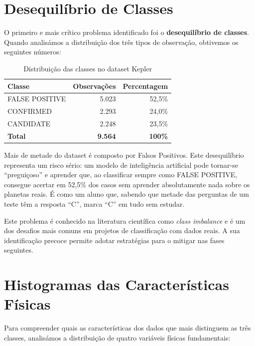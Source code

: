 \documentclass[12pt, a4paper]{report}
\begin{document}
\section{Desequilíbrio de Classes}

O primeiro e mais crítico problema identificado foi o \textbf{desequilíbrio de classes}. Quando analisámos a distribuição dos três tipos de observação, obtivemos os seguintes números:

\begin{table}[h]
\centering
\caption{Distribuição das classes no dataset Kepler}
\begin{tabular}{lrr}
\toprule
\textbf{Classe} & \textbf{Observações} & \textbf{Percentagem} \\
\midrule
FALSE POSITIVE & 5.023 & 52,5\% \\
CONFIRMED & 2.293 & 24,0\% \\
CANDIDATE & 2.248 & 23,5\% \\
\midrule
\textbf{Total} & \textbf{9.564} & \textbf{100\%} \\
\bottomrule
\end{tabular}
\end{table}

\begin{caixaatencao}
Mais de metade do dataset é composto por Falsos Positivos. Este desequilíbrio representa um risco sério: um modelo de inteligência artificial pode tornar-se ``preguiçoso'' e aprender que, ao classificar sempre como FALSE POSITIVE, consegue acertar em 52,5\% dos casos sem aprender absolutamente nada sobre os planetas reais. É como um aluno que, sabendo que metade das perguntas de um teste têm a resposta ``C'', marca ``C'' em tudo sem estudar.
\end{caixaatencao}

Este problema é conhecido na literatura científica como \textit{class imbalance} e é um dos desafios mais comuns em projetos de classificação com dados reais. A sua identificação precoce permite adotar estratégias para o mitigar nas fases seguintes.

\section{Histogramas das Características Físicas}

Para compreender quais as características dos dados que mais distinguem as três classes, analisámos a distribuição de quatro variáveis físicas fundamentais:
\end{document}
